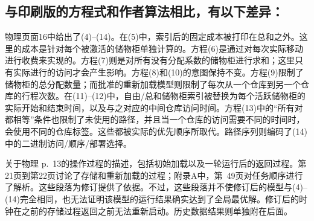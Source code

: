 \documentclass[11pt]{article}
\begin{document}
\subsection*{与印刷版的方程式和作者算法相比，有以下差异：}
物理页面16中给出了(4)--(14)。在(5)中，索引后的固定成本被打印在总和之外。这里的成本是针对每个被激活的储物柜单独计算的。方程(6)是通过对每次实际移动进行收费来实现的。方程(7)则是对所有没有分配系数的储物柜进行求和；这里只有实际进行的访问才会产生影响。方程(8)和(10)的意图保持不变。方程(9)限制了储物柜的总分配数量；而批准的重新加载模型则限制了每次从一个仓库到另一个仓库的行程次数。在(11)--(12)中，自由/总和储物柜索引被替换为每个活跃储物柜的实际开始和结束时间，以及与之对应的中间仓库访问时间。方程(13)中的“所有对都相等”条件也限制了未使用的路径，并且当一个仓库的访问需要不同的时间时，会使用不同的仓库标签。这些都被实际的优先顺序所取代。路径序列则编码了(14)中的二进制访问/顺序/部署选择。

关于物理 p.~13的操作过程的描述，包括初始加载以及一轮运行后的返回过程。第21页到第22页讨论了存储和重新加载的过程；附录A中，第~49页对任务顺序进行了解析。这些段落为修订提供了依据。不过，这些段落并不使修订后的模型与(4)--(14)完全相同，也无法证明该模型的运行结果确实达到了全局最优解。修订后的时钟在之前的存储过程返回之前无法重新启动。历史数据结果则单独附在后面。
\end{document}
